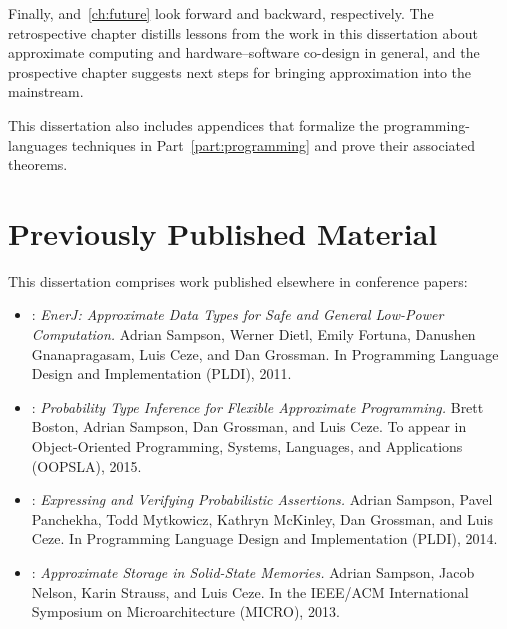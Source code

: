 Finally,  and~\ref{ch:future} look forward and
backward, respectively.
The retrospective chapter distills lessons from the work in this dissertation
about approximate computing and hardware--software co-design in general, and
the prospective chapter suggests next steps for bringing approximation into
the mainstream.

This dissertation also includes appendices that formalize the
programming-languages techniques in Part~\ref{part:programming} and prove
their associated theorems.


\section{Previously Published Material}

This dissertation comprises work published elsewhere in conference papers:

\begin{itemize}
\item {}:
\textit{EnerJ: Approximate Data Types for Safe and General Low-Power
Computation.}
Adrian Sampson, Werner Dietl, Emily Fortuna, Danushen Gnanapragasam, Luis Ceze, and Dan Grossman.
In Programming Language Design and Implementation (PLDI), 2011.
\cite{enerj}

\item {}:
\textit{Probability Type Inference for Flexible Approximate Programming.}
Brett Boston, Adrian Sampson, Dan Grossman, and Luis Ceze.
To appear in Object-Oriented Programming, Systems, Languages, and Applications
(OOPSLA), 2015.
\cite{decaf}

\item {}:
\textit{Expressing and Verifying Probabilistic Assertions.}
Adrian Sampson, Pavel Panchekha, Todd Mytkowicz, Kathryn McKinley, Dan Grossman, and Luis Ceze.
In Programming Language Design and Implementation (PLDI), 2014.
\cite{passert}

\item {}:
\textit{Approximate Storage in Solid-State Memories.}
Adrian Sampson, Jacob Nelson, Karin Strauss, and Luis Ceze.
In the IEEE/ACM International Symposium on Microarchitecture (MICRO), 2013.
\cite{approxstorage}
\end{itemize}
